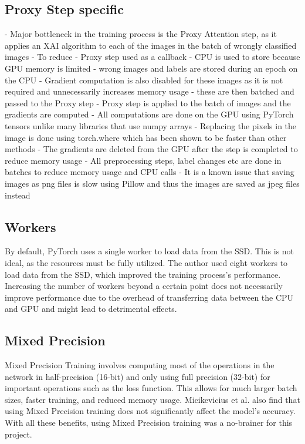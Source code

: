 \subsection{Proxy Step specific}
- Major bottleneck in the training process is the Proxy Attention step, as it applies an XAI algorithm to each of the images in the batch of wrongly classified images
- To reduce
- Proxy step used as a callback
- CPU is used to store because GPU memory is limited
- wrong images and labels are stored during an epoch on the CPU
- Gradient computation is also disabled for these images as it is not required and unnecessarily increases memory usage
- these are then batched and passed to the Proxy step
- Proxy step is applied to the batch of images and the gradients are computed
- All computations are done on the GPU using PyTorch tensors unlike many libraries that use numpy arrays
- Replacing the pixels in the image is done using torch.where which has been shown to be faster than other methods 
- The gradients are deleted from the GPU after the step is completed to reduce memory usage
- All preprocessing steps, label changes etc are done in batches to reduce memory usage and CPU calls
- It is a known issue that saving images as png files is slow using Pillow and thus the images are saved as jpeg files instead 

\subsection{Workers}
By default, PyTorch uses a single worker to load data from the SSD. This is not ideal, as the resources must be fully utilized. The author used eight workers to load data from the SSD, which improved the training process's performance. Increasing the number of workers beyond a certain point does not necessarily improve performance due to the overhead of transferring data between the CPU and GPU and might lead to detrimental effects.

\subsection{Mixed Precision}
Mixed Precision Training \cite{micikeviciusMixedPrecisionTraining2017} involves computing most of the operations in the network in half-precision (16-bit) and only using full precision (32-bit) for important operations such as the loss function. This allows for much larger batch sizes, faster training, and reduced memory usage. Micikevicius et al. also find that using Mixed Precision training does not significantly affect the model's accuracy. With all these benefits, using Mixed Precision training was a no-brainer for this project.

